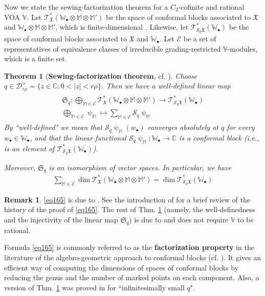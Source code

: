 \documentclass[11pt,b5paper,notitlepage]{article}
\theoremstyle{definition}
\newtheorem{rem}[df]{Remark}
\theoremstyle{plain}
\newtheorem{thm}[df]{Theorem}
\newcommand{\fk}{\mathfrak}
\newcommand{\mc}{\mathcal}
\newcommand{\scr}{\mathscr}
\newcommand{\blt}{\bullet}
\newcommand{\Vbb}{\mathbb V}
\newcommand{\Wbb}{\mathbb W}
\newcommand{\Mbb}{\mathbb M}
\newcommand{\Cbb}{\mathbb C}
\newcommand{\<}{\left\langle}
\renewcommand{\>}{\right\rangle}
\newcommand{\fx}{\mathfrak{X}}
\numberwithin{equation}{section}
\begin{document}
Now we state the sewing-factorization theorem for a $C_2$-cofinite and rational VOA $\Vbb$. Let $\scr T_{\fx}^*(\Wbb_\blt\otimes\Mbb\otimes\Mbb')$ be the space of conformal blocks associated to $\fx$ and $\Wbb_\blt\otimes\Mbb\otimes\Mbb'$, which is finite-dimensional \cite{AN03-finite-dimensional,DGT2}. Likewise, let $\scr T_{\mc S_q\fx}^*(\Wbb_\blt)$ be the space of conformal blocks associated to $\fx$ and $\Wbb_\blt$. Let $\mc E$ be a set of representatives of equivalence classes of irreducible grading-restricted $\Vbb$-modules, which is a finite set.

\begin{thm}[\textbf{Sewing-factorization theorem}, cf. {\cite[Thm. 12.1]{Gui-sewingconvergence}}]  \label{lb77}
Choose $q\in\mc D_{r\rho}^\times=\{z\in\Cbb:0<|z|<r\rho\}$. Then we have a well-defined linear map
\begin{gather}\label{eq170}
\begin{gathered}
\fk S_q:\bigoplus_{\Mbb\in\mc E} \scr T_{\fx}^*(\Wbb_\blt\otimes\Mbb\otimes\Mbb')\rightarrow \scr T_{\mc S_q\fx}^*(\Wbb_\blt)\\
\bigoplus_{\Mbb\in\mc E}\uppsi_\Mbb\mapsto \sum_{\Mbb\in\mc E} \mc S_q\uppsi_\Mbb
\end{gathered}
\end{gather}
By ``well-defined" we mean that  $\mc S_q\uppsi_\Mbb(w_\blt)$ converges absolutely at $q$ for every $w_\blt\in\Wbb_\blt$, and that the linear functional $\mc S_q\uppsi_\Mbb:\Wbb_\blt\rightarrow\Cbb$ is a conformal block (i.e., is an element of $\scr T_{\mc S_q\fx}^*(\Wbb_\blt)$). 

Moreover, $\fk S_q$ is an isomorphism of vector spaces. In particular, we have
\begin{align}
\sum_{\Mbb\in\mc E} \dim\scr T_{\fx}^*(\Wbb_\blt\otimes\Mbb\otimes\Mbb')=\dim \scr T_{\mc S_q\fx}^*(\Wbb_\blt)  \label{eq165}
\end{align}
\end{thm}


\begin{rem}\label{lb78}
\eqref{eq165} is due to \cite[Thm. 7.0.1]{DGT2}. See the introduction of \cite{DGT2} for a brief review of the history of the proof of \eqref{eq165}. The rest of Thm. \ref{lb77} (namely, the well-definedness and the injectivity of the linear map $\fk S_q$) is due to \cite[Thm. 12.1]{Gui-sewingconvergence} and does not require $\Vbb$ to be rational.
\end{rem}

Formula \eqref{eq165} is commonly referred to as the \textbf{factorization property} in the literature of the algebro-geometric approach to conformal blocks (cf. \cite{TUY,BFM-conformal-blocks,NT-P1_conformal_blocks}). It gives an efficient way of computing the dimensions of spaces of conformal blocks by reducing the genus and the number of marked points on each component. Also, a version of Thm. \ref{lb77} was proved in \cite[Thm. 8.5.1]{DGT2} for ``infinitesimally small $q$".
\end{document}
